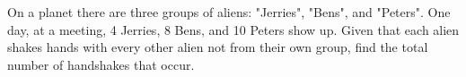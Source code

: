 On a planet there are three groups of aliens: "Jerries", "Bens", and "Peters". One day, at a meeting, 4 Jerries, 8 Bens, and 10 Peters show up. Given that each alien shakes hands with every other alien not from their own group, find the total number of handshakes that occur.
